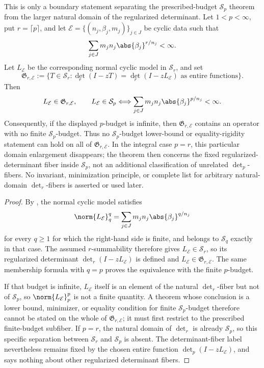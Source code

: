 \begin{proposition}
  \label{prop:schatten-natural-domain-budget-boundary}
  This is only a boundary statement separating the prescribed-budget
  \(\mathcal S_p\) theorem from the larger natural domain of the regularized
  determinant.  Let \(1<p<\infty\), put \(r=\lceil p\rceil\), and let
  \(\mathcal E=\{(n_j,\beta_j,m_j)\}_{j\in J}\) be cyclic data such that
  \[
    \sum_{j\in J}m_jn_j\abs{\beta_j}^{r/n_j}<\infty .
  \]
  Let \(L_{\mathcal E}\) be the corresponding normal cyclic model in
  \(\mathcal S_r\), and set
  \[
    \mathfrak G_{r,\mathcal E}
    :=\{T\in\mathcal S_r:
      \det_r(I-zT)=\det_r(I-zL_{\mathcal E})
      \text{ as entire functions}\}.
  \]
  Then
  \[
    L_{\mathcal E}\in\mathfrak G_{r,\mathcal E},
    \qquad
    L_{\mathcal E}\in\mathcal S_p
    \Longleftrightarrow
    \sum_{j\in J}m_jn_j\abs{\beta_j}^{p/n_j}<\infty .
  \]
  Consequently, if the displayed \(p\)-budget is infinite, then
  \(\mathfrak G_{r,\mathcal E}\) contains an operator with no finite
  \(\mathcal S_p\)-budget.  Thus no \(\mathcal S_p\)-budget lower-bound or
  equality-rigidity statement can hold on all of
  \(\mathfrak G_{r,\mathcal E}\).  In the integral case \(p=r\), this
  particular domain enlargement disappears; the theorem then concerns the
  fixed regularized-determinant fiber inside \(\mathcal S_p\), not an
  additional classification of unrelated \(\det_p\)-fibers.  No invariant,
  minimization principle, or complete list for arbitrary natural-domain
  \(\det_r\)-fibers is asserted or used later.
\end{proposition}

\begin{proof}
  By , the normal cyclic model
  satisfies
  \[
    \norm{L_{\mathcal E}}_q^q
    =\sum_{j\in J}m_jn_j\abs{\beta_j}^{q/n_j}
  \]
  for every \(q\ge1\) for which the right-hand side is finite, and belongs
  to \(\mathcal S_q\) exactly in that case.  The assumed \(r\)-summability
  therefore gives \(L_{\mathcal E}\in\mathcal S_r\), so its regularized
  determinant \(\det_r(I-zL_{\mathcal E})\) is defined and
  \(L_{\mathcal E}\in\mathfrak G_{r,\mathcal E}\).  The same membership
  formula with \(q=p\) proves the equivalence with the finite
  \(p\)-budget.

  If that budget is infinite, \(L_{\mathcal E}\) itself is an element of the
  natural \(\det_r\)-fiber but not of \(\mathcal S_p\), so
  \(\norm{L_{\mathcal E}}_p^p\) is not a finite quantity.  A theorem whose
  conclusion is a lower bound, minimizer, or equality condition for finite
  \(\mathcal S_p\)-budget therefore cannot be stated on the whole of
  \(\mathfrak G_{r,\mathcal E}\); it must first restrict to the prescribed
  finite-budget subfiber.  If \(p=r\), the natural domain of \(\det_r\) is
  already \(\mathcal S_p\), so this specific separation between
  \(\mathcal S_r\) and \(\mathcal S_p\) is absent.  The determinant-fiber
  label nevertheless remains fixed by the chosen entire function
  \(\det_p(I-zL_{\mathcal E})\), and says nothing about other regularized
  determinant fibers.
\end{proof}

